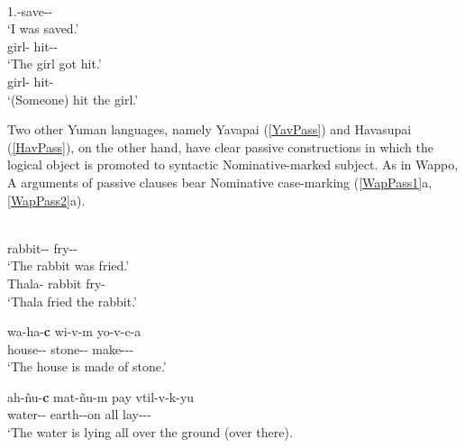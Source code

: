 \begin{exe}\ex\label{MojPass}
\begin{xlist}
\ex\gll {}\\
1.\obj{}-save-\pass{}-\tns{}\\
\glt `I was saved.' 
\ex\gll {} \\
girl-\dem{} hit-\pass{}-\tns{}\\
\glt `The girl got hit.' 
\ex\gll {} \\
girl-\dem{} hit-\tns{}\\
\glt `(Someone) hit the girl.'
\end{xlist}
\end{exe}


Two other Yuman languages, namely Yavapai (\ref{YavPass}) and Havasupai (\ref{HavPass}), %
on the other hand, have clear passive constructions in which the logical object is promoted to syntactic Nominative-marked  subject.
As in Wappo, A arguments of passive clauses bear Nominative  case-marking (\ref{WapPass1}a, \ref{WapPass2}a).

\begin{exe}\ex\label{YavPass}
\begin{xlist}
\ex\gll{} \\
rabbit-\dem{}-\nom{}  fry-\pass{}-\compl{}\\
\glt `The rabbit was fried.' 
\ex\gll {}  \\
Thala-\nom{} rabbit fry-\compl{}\\
\glt `Thala fried the rabbit.'
\end{xlist}
\end{exe}

\pagebreak
\begin{exe}\ex\label{HavPass}
\begin{xlist}
\ex\gll wa-ha-\textbf{c} wi-v-m yo-v-c-a\\
house-\dem{}-\nom{} stone-\dem{}-\prtv{} make-\pass{}-\pl{}-\modal{}\\
\glt `The house is made of stone.' 

\ex\gll ah-\~nu-\textbf{c} mat-\~nu-m pay vtil-v-k-yu\\
water-\dem{}-\nom{} earth-\dem{}-on all lay-\pass{}-\ind{}-\aux{}\\
\glt `The water is lying all over the ground (over there). %
\end{xlist}
\end{exe}

